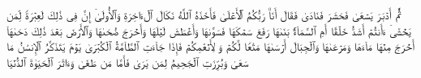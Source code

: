 ثُمَّ أَدۡبَرَ یَسۡعَىٰ%
\stopbuffer%
\startbuffer[\q:79:23]
فَحَشَرَ فَنَادَىٰ%
\stopbuffer%
\startbuffer[\q:79:24]
فَقَالَ أَنَا۠ رَبُّكُمُ ٱلۡأَعۡلَىٰ%
\stopbuffer%
\startbuffer[\q:79:25]
فَأَخَذَهُ ٱللَّهُ نَكَالَ ٱلۡءَاخِرَةِ وَٱلۡأُولَىٰۤ%
\stopbuffer%
\startbuffer[\q:79:26]
إِنَّ فِی ذَٰلِكَ لَعِبۡرَةࣰ لِّمَن یَخۡشَىٰۤ%
\stopbuffer%
\startbuffer[\q:79:27]
ءَأَنتُمۡ أَشَدُّ خَلۡقًا أَمِ ٱلسَّمَاۤءُۚ بَنَىٰهَا%
\stopbuffer%
\startbuffer[\q:79:28]
رَفَعَ سَمۡكَهَا فَسَوَّىٰهَا%
\stopbuffer%
\startbuffer[\q:79:29]
وَأَغۡطَشَ لَیۡلَهَا وَأَخۡرَجَ ضُحَىٰهَا%
\stopbuffer%
\startbuffer[\q:79:30]
وَٱلۡأَرۡضَ بَعۡدَ ذَٰلِكَ دَحَىٰهَاۤ%
\stopbuffer%
\startbuffer[\q:79:31]
أَخۡرَجَ مِنۡهَا مَاۤءَهَا وَمَرۡعَىٰهَا%
\stopbuffer%
\startbuffer[\q:79:32]
وَٱلۡجِبَالَ أَرۡسَىٰهَا%
\stopbuffer%
\startbuffer[\q:79:33]
مَتَٰعࣰا لَّكُمۡ وَ لِأَنۡعَٰمِكُمۡ%
\stopbuffer%
\startbuffer[\q:79:34]
فَإِذَا جَاۤءَتِ ٱلطَّاۤمَّةُ ٱلۡكُبۡرَىٰ%
\stopbuffer%
\startbuffer[\q:79:35]
یَوۡمَ یَتَذَكَّرُ ٱلۡإِنسَٰنُ مَا سَعَىٰ%
\stopbuffer%
\startbuffer[\q:79:36]
وَبُرِّزَتِ ٱلۡجَحِیمُ لِمَن یَرَىٰ%
\stopbuffer%
\startbuffer[\q:79:37]
فَأَمَّا مَن طَغَىٰ%
\stopbuffer%
\startbuffer[\q:79:38]
وَءَاثَرَ ٱلۡحَیَوٰةَ ٱلدُّنۡیَا%
\stopbuffer%
